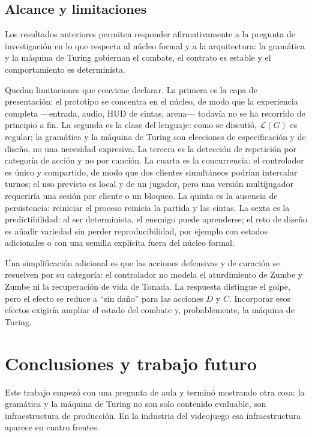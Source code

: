 \documentclass[9pt]{ieeeconf}
\newcommand{\Lang}{\mathcal{L}}
\begin{document}
\subsection{Alcance y limitaciones}
\label{sec:alcance}

Los resultados anteriores permiten responder afirmativamente a la pregunta de investigación en lo que respecta al núcleo formal y a la arquitectura: la gramática y la máquina de Turing gobiernan el combate, el contrato es estable y el comportamiento es determinista.

Quedan limitaciones que conviene declarar. La primera es la capa de presentación: el prototipo se concentra en el núcleo, de modo que la experiencia completa ---entrada, audio, HUD de cintas, arena--- todavía no se ha recorrido de principio a fin. La segunda es la clase del lenguaje: como se discutió, $\Lang(G)$ es regular; la gramática y la máquina de Turing son elecciones de especificación y de diseño, no una necesidad expresiva. La tercera es la detección de repetición por categoría de acción y no por canción. La cuarta es la concurrencia: el controlador es único y compartido, de modo que dos clientes simultáneos podrían intercalar turnos; el uso previsto es local y de un jugador, pero una versión multijugador requeriría una sesión por cliente o un bloqueo. La quinta es la ausencia de persistencia: reiniciar el proceso reinicia la partida y las cintas. La sexta es la predictibilidad: al ser determinista, el enemigo puede aprenderse; el reto de diseño es añadir variedad sin perder reproducibilidad, por ejemplo con estados adicionales o con una semilla explícita fuera del núcleo formal.

Una simplificación adicional es que las acciones defensivas y de curación se resuelven por su categoría: el controlador no modela el aturdimiento de Zumbe y Zumbe ni la recuperación de vida de Tonada. La respuesta distingue el golpe, pero el efecto se reduce a ``sin daño'' para las acciones $D$ y $C$. Incorporar esos efectos exigiría ampliar el estado del combate y, probablemente, la máquina de Turing.


\section{Conclusiones y trabajo futuro}
\label{sec:conclusiones}

Este trabajo empezó con una pregunta de aula y terminó mostrando otra cosa: la gramática y la máquina de Turing no son solo contenido evaluable, son infraestructura de producción. En la industria del videojuego esa infraestructura aparece en cuatro frentes.
\end{document}
